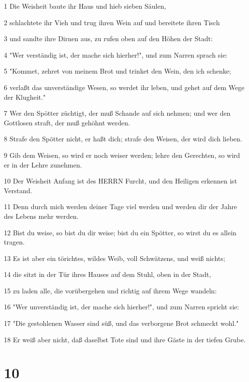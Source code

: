 \par 1 Die Weisheit baute ihr Haus und hieb sieben Säulen,
\par 2 schlachtete ihr Vieh und trug ihren Wein auf und bereitete ihren Tisch
\par 3 und sandte ihre Dirnen aus, zu rufen oben auf den Höhen der Stadt:
\par 4 "Wer verständig ist, der mache sich hierher!", und zum Narren sprach sie:
\par 5 "Kommet, zehret von meinem Brot und trinket den Wein, den ich schenke;
\par 6 verlaßt das unverständige Wesen, so werdet ihr leben, und gehet auf dem Wege der Klugheit."
\par 7 Wer den Spötter züchtigt, der muß Schande auf sich nehmen; und wer den Gottlosen straft, der muß gehöhnt werden.
\par 8 Strafe den Spötter nicht, er haßt dich; strafe den Weisen, der wird dich lieben.
\par 9 Gib dem Weisen, so wird er noch weiser werden; lehre den Gerechten, so wird er in der Lehre zunehmen.
\par 10 Der Weisheit Anfang ist des HERRN Furcht, und den Heiligen erkennen ist Verstand.
\par 11 Denn durch mich werden deiner Tage viel werden und werden dir der Jahre des Lebens mehr werden.
\par 12 Bist du weise, so bist du dir weise; bist du ein Spötter, so wirst du es allein tragen.
\par 13 Es ist aber ein törichtes, wildes Weib, voll Schwätzens, und weiß nichts;
\par 14 die sitzt in der Tür ihres Hauses auf dem Stuhl, oben in der Stadt,
\par 15 zu laden alle, die vorübergehen und richtig auf ihrem Wege wandeln:
\par 16 "Wer unverständig ist, der mache sich hierher!", und zum Narren spricht sie:
\par 17 "Die gestohlenen Wasser sind süß, und das verborgene Brot schmeckt wohl."
\par 18 Er weiß aber nicht, daß daselbst Tote sind und ihre Gäste in der tiefen Grube.

\chapter{10}


